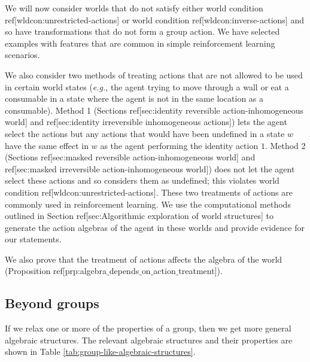 We will now consider worlds that do not satisfy either world condition ref[wldcon:unrestricted-actions] or world condition ref[wldcon:inverse-actions] and so have transformations that do not form a group action.
We have selected examples with features that are common in simple reinforcement learning scenarios.

We also consider two methods of treating actions that are not allowed to be used in certain world states (\textit{e.g.}, the agent trying to move through a wall or eat a consumable in a state where the agent is not in the same location as a consumable).
Method 1 (Sections ref[sec:identity reversible action-inhomogeneous world] and ref[sec:identity irreversible inhomogeneous actions]) lets the agent select the actions but any actions that would have been undefined in a state $w$ have the same effect in $w$ as the agent performing the identity action $1$.
Method 2 (Sections ref[sec:masked reversible action-inhomogeneous world] and ref[sec:masked irreversible action-inhomogeneous world]) does not let the agent select these actions and so considers them as undefined; this violates world condition ref[wldcon:unrestricted-actions].
These two treatments of actions are commonly used in reinforcement learning.
We use the computational methods outlined in Section ref[sec:Algorithmic exploration of world structures] to generate the action algebras of the agent in these worlds and provide evidence for our statements.

We also prove that the treatment of actions affects the algebra of the world (Proposition ref[prp:algebra$\_$depends$\_$on$\_$action$\_$treatment]).

\subsection{Beyond groups}

If we relax one or more of the properties of a group, then we get more general algebraic structures.
The relevant algebraic structures and their properties are shown in Table \ref{tab:group-like-algebraic-structures}.


